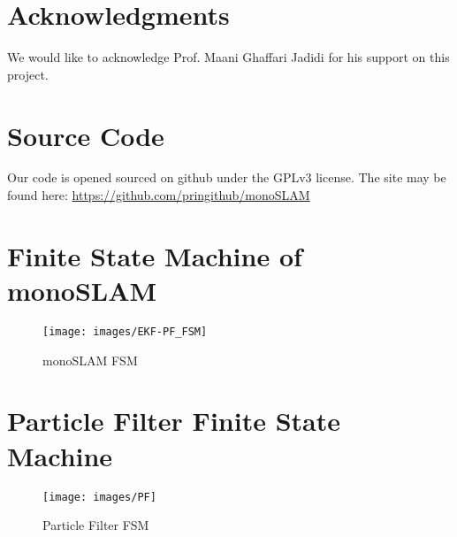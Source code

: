 \documentclass[conference]{IEEEtran}
\begin{document}
\section{Acknowledgments}
We would like to acknowledge Prof. Maani Ghaffari Jadidi for his support on this project.

\section{Source Code}
Our code is opened sourced on github under the GPLv3 license. The site may be found here: \href{https://github.com/pringithub/monoSLAM}{https://github.com/pringithub/monoSLAM}





\onecolumn
\begin{appendices}
\section{Finite State Machine of monoSLAM}
\label{sec:allFSM}
\begin{figure}[H]
\centering
\texttt{[image: images/EKF-PF\_FSM]}
\caption{monoSLAM FSM}
\label{fig:allFSM}
\end{figure}

\section{Particle Filter Finite State Machine}
\label{sec:pfFSM}
\begin{figure}[H]
\centering
\texttt{[image: images/PF]}
\caption{Particle Filter FSM}
\label{fig:pfFSM}
\end{figure}


\end{appendices}
\end{document}
